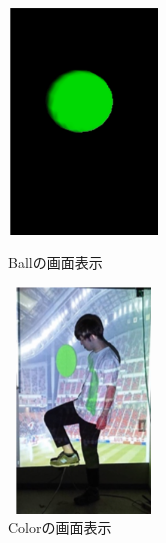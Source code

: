 \begin{figure}[p]
    \begin{minipage}{0.5\hsize}
     \begin{center}
      \includegraphics[width=4cm,height=6cm]{image/ball.png}
     \end{center}
     \caption{Ballの画面表示}
     \label{ball}
    \end{minipage}
    \begin{minipage}{0.5\hsize}
     \begin{center}
      \includegraphics[width=4cm,height=6cm]{image/color.png}
     \end{center}
     \caption{Colorの画面表示}
     \label{color}
    \end{minipage}
\end{figure}

